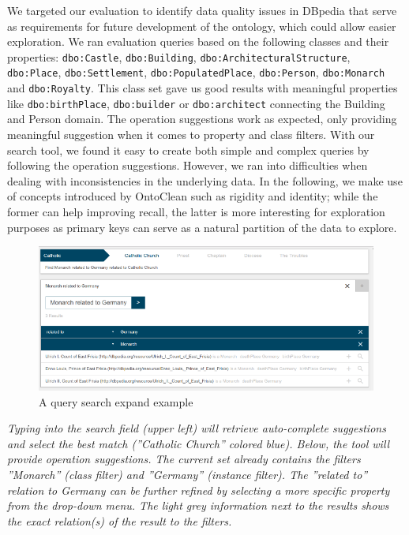 \documentclass{sig-alternate}
\makeatletter
\def\maxwidth#1{\ifdim\Gin@nat@width>#1 #1\else\Gin@nat@width\fi}
\makeatother
\begin{document}
We targeted our evaluation to identify data quality issues in DBpedia that serve as requirements for future development of the ontology, which could allow easier exploration. We ran evaluation queries based on the following classes and their properties: \Verb+dbo:Castle+, \Verb+dbo:Building+,  \Verb+dbo:ArchitecturalStructure+,  \Verb+dbo:Place+,  \Verb+dbo:Settlement+, \Verb+dbo:PopulatedPlace+, \Verb+dbo:Person+, \Verb+dbo:Monarch+ and \Verb+dbo:Royalty+. This class set gave us good results with meaningful properties like \Verb+dbo:birthPlace+, \Verb+dbo:builder+ or \Verb+dbo:architect+ connecting the Building and Person domain. The operation suggestions work as expected, only providing meaningful suggestion when it comes to property and class ﬁlters. With our search tool, we found it easy to create both simple and complex queries by following the operation suggestions. However, we ran into diﬃculties when dealing with inconsistencies in the underlying data. In the following, we make use of concepts introduced by OntoClean  \cite{_Ref490639413} such as rigidity and identity; while the former can help improving recall, the latter is more interesting for exploration purposes as primary keys can serve as a natural partition of the data to explore.
\begin{figure}[h!]
\centering
\includegraphics[width=\maxwidth{\columnwidth}]{./img/image3.png}
\cprotect\caption{  A query search expand example}
\label{_Ref490606461}
\end{figure}


{\em Typing into the search ﬁeld (upper left) will retrieve auto-complete suggestions and select the best match (''Catholic Church'' colored blue). Below, the tool will provide operation suggestions. The current set already contains the ﬁlters ''Monarch'' (class ﬁlter) and ''Germany'' (instance ﬁlter). The ''related to'' relation to Germany can be further reﬁned by selecting a more speciﬁc property from the drop-down menu. The light grey information next to the results shows the exact relation(s) of the result to the ﬁlters.}
\end{document}

